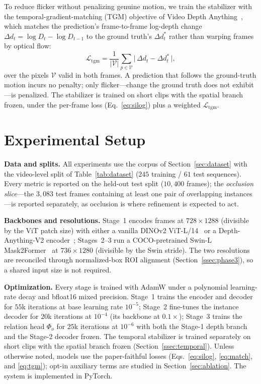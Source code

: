 \documentclass[sigconf, review=true]{acmart}
\begin{document}
To reduce flicker without penalizing genuine motion, we train the stabilizer
with the temporal-gradient-matching (TGM) objective of Video Depth
Anything~\cite{chen2025vda}, which matches the prediction's frame-to-frame
log-depth change $\Delta d_t=\log D_t-\log D_{t-1}$ to the ground truth's
$\Delta d^{*}_t$ rather than warping frames by optical flow:
\begin{equation}
\label{eq:tgm}
\mathcal{L}_{\mathrm{tgm}} = \frac{1}{|\mathcal{V}|}\sum_{p\in\mathcal{V}}
\big|\,\Delta d_t - \Delta d^{*}_t\,\big|,
\end{equation}
over the pixels $\mathcal{V}$ valid in both frames. A prediction that follows the
ground-truth motion incurs no penalty; only flicker---change the ground truth
does not exhibit---is penalized. The stabilizer is trained on short clips with
the spatial branch frozen, under the per-frame loss (Eq.~\eqref{eq:silog}) plus a
weighted $\mathcal{L}_{\mathrm{tgm}}$.

\section{Experimental Setup}
\label{sec:setup}

\noindent\textbf{Data and splits.} All experiments use the corpus of
Section~\ref{sec:dataset} with the video-level split of Table~\ref{tab:dataset}
($245$ training / $61$ test sequences). Every metric is reported on the
held-out test split ($10{,}400$ frames); the \emph{occlusion slice}---the
$3{,}083$ test frames containing at least one pair of overlapping
instances---is reported separately, as occlusion is where refinement is
expected to act.

\smallskip\noindent\textbf{Backbones and resolutions.} Stage~1 encodes frames at
$728\times1288$ (divisible by the ViT patch size) with either a vanilla DINOv2
ViT-L/14~\cite{oquab2024dinov2} or a Depth-Anything-V2
encoder~\cite{yang2024depthanythingv2}; Stages~2--3 run a COCO-pretrained Swin-L
Mask2Former~\cite{cheng2022mask2former,liu2021swin} at $736\times1280$ (divisible
by the Swin stride). The two resolutions are reconciled through normalized-box
ROI alignment (Section~\ref{ssec:phase3}), so a shared input size is not
required.

\smallskip\noindent\textbf{Optimization.} Every stage is trained with
AdamW under a polynomial learning-rate decay and bfloat16 mixed precision.
Stage~1 trains the encoder and decoder for $55$k iterations at base learning
rate $10^{-5}$; Stage~2 fine-tunes the instance decoder for $20$k iterations at
$10^{-4}$ (its backbone at $0.1\times$); Stage~3 trains the relation head
$\Phi_o$ for $25$k iterations at $10^{-6}$ with both the Stage-1 depth branch and
the Stage-2 decoder frozen. The temporal stabilizer is trained separately on
short clips with the spatial branch frozen (Section~\ref{ssec:temporal}). Unless
otherwise noted, models use the paper-faithful losses (Eqs.~\eqref{eq:silog},
\eqref{eq:match}, and \eqref{eq:tgm}); opt-in auxiliary terms are studied in
Section~\ref{sec:ablation}. The system is implemented in PyTorch.
\end{document}

